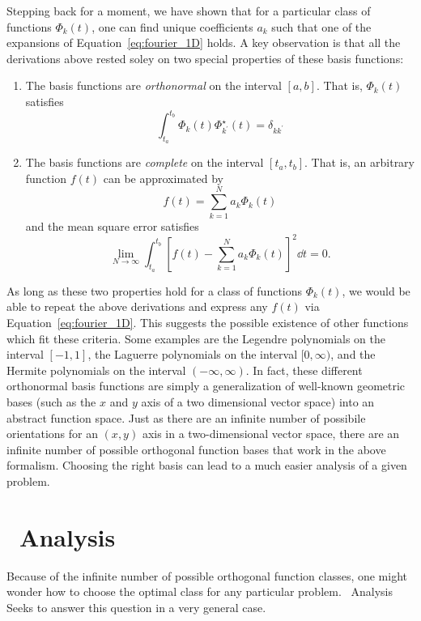 Stepping back for a moment, we have shown that for a particular
class of functions $\Phi_k(t)$, one can find unique coefficients
$a_k$ such that one of the expansions of Equation~\ref{eq:fourier_1D} holds.
A key observation is that all the derivations above rested 
soley on two special properties of these basis functions:
\begin{enumerate}
  \item
    The basis functions are {\it orthonormal} on the interval $[a, b]$.
    That is, $\Phi_k(t)$ satisfies
    \begin{equation}
      \int_{t_a}^{t_b} \Phi_k(t) \Phi^\star_{k^\prime}(t) = \delta_{kk^\prime}
    \end{equation}
  \item
    The basis functions are {\it complete} on the interval $[t_a, t_b]$.
    That is, an arbitrary function $f(t)$ can be approximated by
    \begin{equation}
      f(t) = \sum_{k=1}^N a_k \Phi_k(t)
    \end{equation}
    and the mean square error satisfies
    \begin{equation}
      \label{eq:completeness}
      \lim_{N\to\infty} \int_{t_a}^{t_b}
      \left[f(t) - \sum_{k=1}^{N}a_k \Phi_k(t)\right]^2 \dd t = 0.
    \end{equation}
\end{enumerate}
As long as these two properties hold for a class of functions $\Phi_k(t)$,
we would be able to repeat the above derivations and express any $f(t)$
via Equation~\ref{eq:fourier_1D}.
This suggests the possible existence of other functions which fit these
criteria.  Some examples are the Legendre polynomials on the interval
$[-1, 1]$, the Laguerre polynomials on the interval $[0, \infty)$, and
the Hermite polynomials on the interval $(-\infty, \infty)$.
In fact, these different orthonormal basis functions are simply a
generalization of well-known geometric bases (such as the $x$ and $y$ axis
of a two dimensional vector space) into an abstract function space.
Just as there are an infinite number of possibile orientations for
an $(x, y)$ axis in a two-dimensional vector space, there are an infinite
number of possible orthogonal function bases that work in the above
formalism.  Choosing the right basis can lead to a much easier analysis of
a given problem.

\section{\KL\ Analysis}
Because of the infinite number of possible orthogonal function classes,
one might wonder how to choose the optimal class for any particular problem.
\KL\ Analysis Seeks to answer this question in a very general case.

